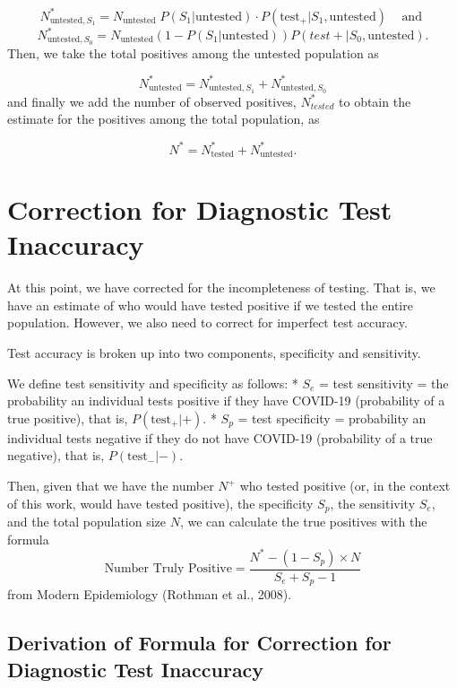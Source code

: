 \documentclass[12pt,twoside]{smiththesis}
\begin{document}
\[N^*_{\text{untested},S_1} = N_{\text{untested}} \; P(S_1|\text{untested}) \cdot P(\text{test}_+ | S_1,\text{untested}) \;\;\;\text{ and }\]
\[N^*_{\text{untested},S_0} = N_{\text{untested}}(1-P(S_1|\text{untested}))P(test + | S_0,\text{untested}).\]
Then, we take the total positives among the untested population as

\[N^*_{\text{untested}} = N^*_{\text{untested},S_1} + N^*_{\text{untested},S_0}\]
and finally we add the number of observed positives, \(N^*_{tested}\) to obtain the estimate for the positives among the total population, as

\[N^* = N^*_{\text{tested}} +N^*_{\text{untested}}.\]

\hypertarget{correct-test-inaccuracy}{%
\section{Correction for Diagnostic Test Inaccuracy}\label{correct-test-inaccuracy}}

At this point, we have corrected for the incompleteness of testing. That is, we have an estimate of who would have tested positive if we tested the entire population. However, we also need to correct for imperfect test accuracy.

Test accuracy is broken up into two components, specificity and sensitivity.

We define test sensitivity and specificity as follows:
* \(S_e\) = test sensitivity = the probability an individual tests positive if they have COVID-19 (probability of a true positive), that is, \(P(\text{test}_+ | +)\).
* \(S_p\) = test specificity = probability an individual tests negative if they do not have COVID-19 (probability of a true negative), that is, \(P(\text{test}_- |-)\).

Then, given that we have the number \(N^+\) who tested positive (or, in the context of this work, would have tested positive), the specificity \(S_p\), the sensitivity \(S_e\), and the total population size \(N\), we can calculate the true positives with the formula
\[\text{Number Truly Positive} = \dfrac{N^* - (1-S_p) \times N}{S_e+S_p-1}\]
from Modern Epidemiology (Rothman et al., 2008).

\hypertarget{derivation-of-formula-for-correction-for-diagnostic-test-inaccuracy}{%
\subsection{Derivation of Formula for Correction for Diagnostic Test Inaccuracy}\label{derivation-of-formula-for-correction-for-diagnostic-test-inaccuracy}}
\end{document}

